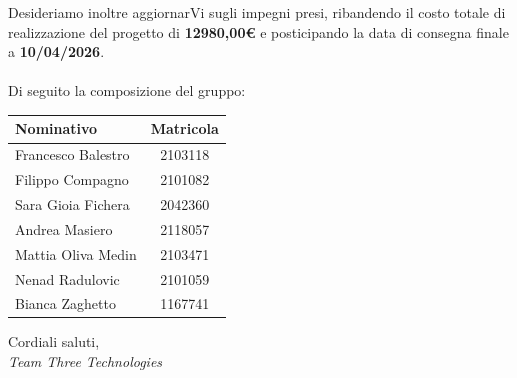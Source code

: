 \documentclass[a4paper,12pt]{article}
\begin{document}
Desideriamo inoltre aggiornarVi sugli impegni presi, ribandendo il costo totale di realizzazione del progetto di \textbf{12980,00\euro} e posticipando la data di consegna finale a \textbf{10/04/2026}.\\\\
Di seguito la composizione del gruppo: 
\begin{center}
\begin{tabular}{|l|c|}
\hline
\rowcolor{lightgray}
\textbf{Nominativo} & \textbf{Matricola} \\ 
\hline
Francesco Balestro & 2103118 \\ 
Filippo Compagno & 2101082 \\ 
Sara Gioia Fichera & 2042360 \\ 
Andrea Masiero & 2118057\\
Mattia Oliva Medin & 2103471\\
Nenad Radulovic & 2101059\\
Bianca Zaghetto & 1167741\\
\hline

\end{tabular}
\end{center}

\vspace{1cm}
Cordiali saluti,\\[0.3cm]
\textit{Team Three Technologies}
\end{document}
